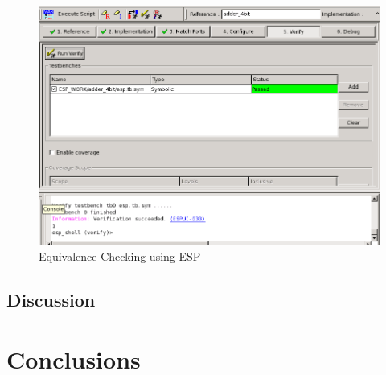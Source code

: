 \documentclass[12pt]{article}
\begin{document}
\begin{figure}[H]
\centering
\includegraphics[width=1\linewidth]{esp}
\caption{Equivalence Checking using ESP}
\label{fig:esp}
\end{figure}



\subsection{Discussion}

\section{Conclusions}
\end{document}
